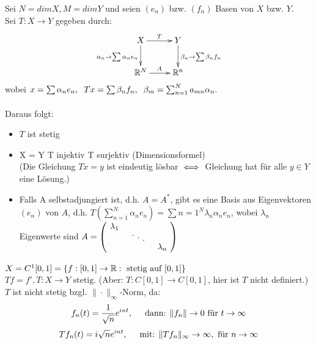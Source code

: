 Sei $N = dim X, M = dim Y$ und seien $(e_n)$ bzw. $(f_n)$ Basen von $X$ bzw. $Y$. 	\\
Sei $T : X \rightarrow Y$ gegeben durch: \\
\[ \begin{xy} \xymatrix{
	X \ar[r]^T	\ar[d]_{ \alpha_{n} \rightarrow \sum \alpha_{n} e_{n} }  &   Y \ar[d]^{ \beta_{n} \rightarrow \sum \beta_{n} f_{n} }  \\
      	\MdR^{N} 	\ar[r]^A    				&   \MdR^{n}  				
} \end{xy} \]
wobei $x = \sum \alpha_{n} e_{n},\hspace{0.2cm} Tx = \sum \beta_n f_n, \hspace{0.2cm} \beta_m = \sum_{n = 1}^{N} a_{mn} \alpha_{n}. $ \\ \\
Daraus folgt:
\begin{itemize}
	\item $T$ ist stetig
	\item X = Y \gdw T injektiv \gdw T surjektiv (Dimensionsformel) \\
	(Die Gleichung $Tx = y$ ist eindeutig lösbar $\iff$ Gleichung hat für alle $y \in Y$ eine Lösung.)
	\item Falls A selbstadjungiert ist, d.h. $A = A^{*}$, gibt es eine Basis aus Eigenvektoren $(e_{n})$ von $A$, d.h. $ T( \sum_{n=1}^{N} \alpha_{n} e_{n} ) = \sum{n=1}^{N} \lambda_{n} \alpha_{n} e_{n}$, wobei $\lambda_{n}$ Eigenwerte sind $A =
			\begin{pmatrix}
				\diagentry{\lambda_{1}}\\
				&\diagentry{\xddots}\\
				&&\diagentry{\lambda_{n}}\\
			\end{pmatrix} $
\end{itemize}

\begin{beispiel}
$X = C^{1}[0, 1] = \{ f : [0, 1] \rightarrow \mathbb{R}: \text{ stetig auf } [0, 1] \}$ \\
$T f = f', T : X \rightarrow Y \text{ stetig.} $ (Aber: $T: C[0, 1] \rightarrow C[0, 1]$, hier ist $T$ nicht definiert.) \\

$T$ ist nicht stetig bzgl. $\| \cdot \|_{\infty}$-Norm, da:
\[ f_{n}(t) = \frac{1}{\sqrt{n}}e^{int}, \hspace{0.5cm}  \text{dann: } \|f_{n}\| \rightarrow 0 \text{ für } t \rightarrow \infty \]	
\[ T f_{n}(t) = i \sqrt{n} e^{int}, \hspace{0.5cm} \text{mit: } \| T f_{n} \|_{\infty} \rightarrow \infty, \text{ für } n \rightarrow \infty \]
\end{beispiel}

